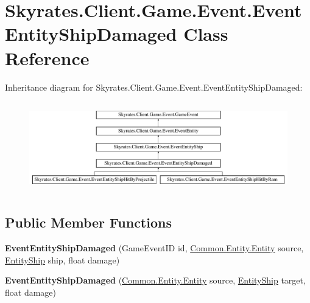 \hypertarget{class_skyrates_1_1_client_1_1_game_1_1_event_1_1_event_entity_ship_damaged}{\section{Skyrates.\-Client.\-Game.\-Event.\-Event\-Entity\-Ship\-Damaged Class Reference}
\label{class_skyrates_1_1_client_1_1_game_1_1_event_1_1_event_entity_ship_damaged}
}
Inheritance diagram for Skyrates.\-Client.\-Game.\-Event.\-Event\-Entity\-Ship\-Damaged\-:\begin{figure}[H]
\begin{center}
\leavevmode
\includegraphics[height=3.977273cm]{class_skyrates_1_1_client_1_1_game_1_1_event_1_1_event_entity_ship_damaged}
\end{center}
\end{figure}
\subsection*{Public Member Functions}
\begin{DoxyCompactItemize}
\item 
\hypertarget{class_skyrates_1_1_client_1_1_game_1_1_event_1_1_event_entity_ship_damaged_a18f90ff076ba51a0167f4aac10a225cb}{{\bfseries Event\-Entity\-Ship\-Damaged} (Game\-Event\-I\-D id, \hyperlink{class_skyrates_1_1_common_1_1_entity_1_1_entity}{Common.\-Entity.\-Entity} source, \hyperlink{class_skyrates_1_1_common_1_1_entity_1_1_entity_ship}{Entity\-Ship} ship, float damage)}\label{class_skyrates_1_1_client_1_1_game_1_1_event_1_1_event_entity_ship_damaged_a18f90ff076ba51a0167f4aac10a225cb}

\item 
\hypertarget{class_skyrates_1_1_client_1_1_game_1_1_event_1_1_event_entity_ship_damaged_a4e157052f0469f3f334d7585bf9023e7}{{\bfseries Event\-Entity\-Ship\-Damaged} (\hyperlink{class_skyrates_1_1_common_1_1_entity_1_1_entity}{Common.\-Entity.\-Entity} source, \hyperlink{class_skyrates_1_1_common_1_1_entity_1_1_entity_ship}{Entity\-Ship} target, float damage)}\label{class_skyrates_1_1_client_1_1_game_1_1_event_1_1_event_entity_ship_damaged_a4e157052f0469f3f334d7585bf9023e7}

\end{DoxyCompactItemize}
